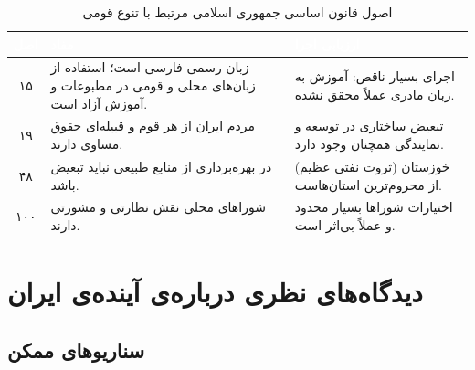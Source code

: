\begin{table}[htbp]
\centering
\caption{اصول قانون اساسی جمهوری اسلامی مرتبط با تنوع قومی}
\label{tab:iran-constitution}
\begin{tabularx}{\textwidth}{c >{\raggedright\arraybackslash}X >{\small\color{TextMid}\raggedright\arraybackslash}X}
\toprule
\rowcolor{PrimaryDark}
\textcolor{white}{\bfseries اصل} &
\textcolor{white}{\bfseries مفاد} &
\textcolor{white}{\bfseries ارزیابی اجرا} \\
\midrule
۱۵ &
زبان رسمی فارسی است؛ استفاده از زبان‌های محلی و قومی در مطبوعات و آموزش آزاد است. &
اجرای بسیار ناقص: آموزش به زبان مادری عملاً محقق نشده. \\
۱۹ &
مردم ایران از هر قوم و قبیله‌ای حقوق مساوی دارند. &
تبعیض ساختاری در توسعه و نمایندگی همچنان وجود دارد. \\
۴۸ &
در بهره‌برداری از منابع طبیعی نباید تبعیض باشد. &
خوزستان (ثروت نفتی عظیم) از محروم‌ترین استان‌هاست. \\
۱۰۰ &
شوراهای محلی نقش نظارتی و مشورتی دارند. &
اختیارات شوراها بسیار محدود و عملاً بی‌اثر است. \\
\bottomrule
\end{tabularx}
\end{table}

\section{دیدگاه‌های نظری درباره‌ی آینده‌ی ایران}

\subsection{سناریوهای ممکن}

